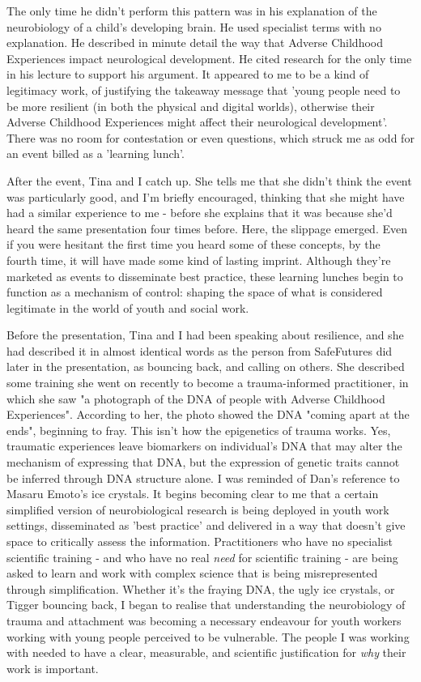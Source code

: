 The only time he didn't perform this pattern was in his explanation of the neurobiology of a child's developing brain. He used specialist terms with no explanation. He described in minute detail the way that Adverse Childhood Experiences impact neurological development. He cited research for the only time in his lecture to support his argument. It appeared to me to be a kind of legitimacy work, of justifying the takeaway message that 'young people need to be more resilient (in both the physical and digital worlds), otherwise their Adverse Childhood Experiences might affect their neurological development'. There was no room for contestation or even questions, which struck me as odd for an event billed as a 'learning lunch'.

After the event, Tina and I catch up. She tells me that she didn't think the event was particularly good, and I'm briefly encouraged, thinking that she might have had a similar experience to me - before she explains that it was because she'd heard the same presentation four times before. Here, the slippage emerged. Even if you were hesitant the first time you heard some of these concepts, by the fourth time, it will have made some kind of lasting imprint. Although they're marketed as events to disseminate best practice, these learning lunches begin to function as a mechanism of control: shaping the space of what is considered legitimate in the world of youth and social work. 

Before the presentation, Tina and I had been speaking about resilience, and she had described it in almost identical words as the person from SafeFutures did later in the presentation, as bouncing back, and calling on others. She described some training she went on recently to become a trauma-informed practitioner, in which she saw "a photograph of the DNA of people with Adverse Childhood Experiences". According to her, the photo showed the DNA "coming apart at the ends", beginning to fray. This isn't how the epigenetics of trauma works. Yes, traumatic experiences leave biomarkers on individual's DNA that may alter the mechanism of expressing that DNA, but the expression of genetic traits cannot be inferred through DNA structure alone. I was reminded of Dan's reference to Masaru Emoto's ice crystals. It begins becoming clear to me that a certain simplified version of neurobiological research is being deployed in youth work settings, disseminated as 'best practice' and delivered in a way that doesn't give space to critically assess the information. Practitioners who have no specialist scientific training - and who have no real \textit{need} for scientific training - are being asked to learn and work with complex science that is being misrepresented through simplification. Whether it's the fraying DNA, the ugly ice crystals, or Tigger bouncing back, I began to realise that understanding the neurobiology of trauma and attachment was becoming a necessary endeavour for youth workers working with young people perceived to be vulnerable. The people I was working with needed to have a clear, measurable, and scientific justification for \textit{why} their work is important.

